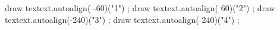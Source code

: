 \startMPpage[offset=2pt]

    draw textext.autoalign( -60)("1") ;
    draw textext.autoalign(  60)("2") ;
    draw textext.autoalign(-240)("3") ;
    draw textext.autoalign( 240)("4") ;

\stopMPpage
